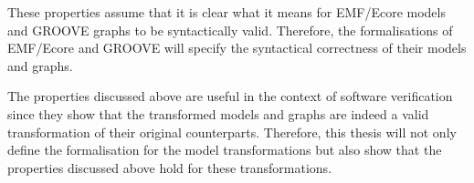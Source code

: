 These properties assume that it is clear what it means for EMF/Ecore models and GROOVE graphs to be syntactically valid. Therefore, the formalisations of EMF/Ecore and GROOVE will specify the syntactical correctness of their models and graphs.

The properties discussed above are useful in the context of software verification since they show that the transformed models and graphs are indeed a valid transformation of their original counterparts. Therefore, this thesis will not only define the formalisation for the model transformations but also show that the properties discussed above hold for these transformations.